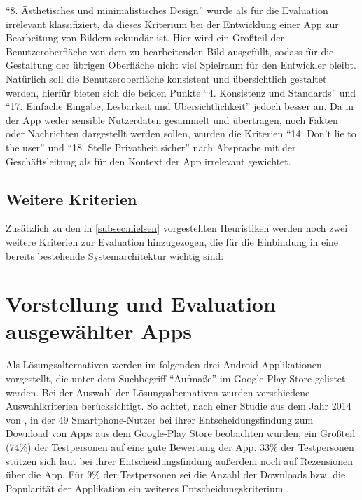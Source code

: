 \noindent
``8. Ästhetisches und minimalistisches Design'' wurde als für die Evaluation irrelevant klassifiziert, da dieses Kriterium bei der Entwicklung einer App zur Bearbeitung von Bildern sekundär ist.
Hier wird ein Großteil der Benutzeroberfläche von dem zu bearbeitenden Bild ausgefüllt, sodass für die Gestaltung der übrigen Oberfläche nicht viel Spielraum für den Entwickler bleibt.
Natürlich soll die Benutzeroberfläche konsistent und übersichtlich gestaltet werden, hierfür bieten sich die beiden Punkte ``4. Konsistenz und Standards'' und ``17. Einfache Eingabe, Lesbarkeit und Übersichtlichkeit'' jedoch besser an.
Da in der App weder sensible Nutzerdaten gesammelt und übertragen, noch Fakten oder Nachrichten dargestellt werden sollen, wurden die Kriterien ``14. Don't lie to the user'' und ``18. Stelle Privatheit sicher'' nach Absprache mit der Geschäftsleitung als für den Kontext der App irrelevant gewichtet.

\subsection{Weitere Kriterien}
Zusätzlich zu den in \autoref{subsec:nielsen} vorgestellten Heuristiken werden noch zwei weitere Kriterien zur Evaluation hinzugezogen, die für die Einbindung in eine bereits bestehende Systemarchitektur wichtig sind: 

\begin{itemize}
\end{itemize}

\section{Vorstellung und Evaluation ausgewählter Apps}\label{sec:evaluation}
Als Lösungsalternativen werden im folgenden drei Android-Applikationen vorgestellt, die unter dem Suchbegriff ``Aufmaße'' im Google Play-Store gelistet werden.
Bei der Auswahl der Lösungsalternativen wurden verschiedene Auswahlkriterien berücksichtigt.
So achtet, nach einer Studie aus dem Jahr 2014 von \citeauthor{Dogruel14}, in der 49 Smartphone-Nutzer bei ihrer Entscheidungsfindung zum Download von Apps aus dem Google-Play Store beobachten wurden, ein Großteil (74\%) der Testpersonen auf eine gute Bewertung der App.
33\% der Testpersonen stützen sich laut \citeauthor{Dogruel14} bei ihrer Entscheidungsfindung außerdem noch auf Rezensionen über die App.
Für 9\% der Testpersonen sei die Anzahl der Downloads bzw. die Popularität der Applikation ein weiteres Entscheidungskriterium \citep{Dogruel14}. \\

